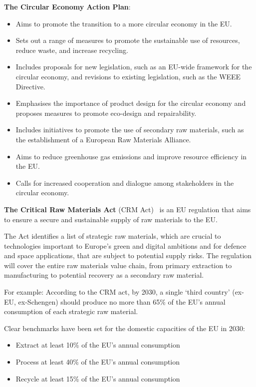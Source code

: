 \textbf{The Circular Economy Action Plan}:
\begin{itemize}
  \item Aims to promote the transition to a more circular economy in the EU.
  \item Sets out a range of measures to promote the sustainable use of resources, reduce waste, and increase recycling.
  \item Includes proposals for new legislation, such as an EU-wide framework for the circular economy, and revisions to existing legislation, such as the WEEE Directive.
  \item Emphasises the importance of product design for the circular economy and proposes measures to promote eco-design and repairability.
  \item Includes initiatives to promote the use of secondary raw materials, such as the establishment of a European Raw Materials Alliance.
  \item Aims to reduce greenhouse gas emissions and improve resource efficiency in the EU.
  \item Calls for increased cooperation and dialogue among stakeholders in the circular economy.
\end{itemize}



\textbf{The Critical Raw Materials Act} (CRM Act)~\cite{eu2023crmact} is an EU regulation that aims to ensure a secure and sustainable supply of raw materials to the EU.

The Act identifies a list of strategic raw materials, which are crucial to technologies important to Europe's green and digital ambitions and for defence and space applications, that are subject to potential supply risks. The regulation will cover the entire raw materials value chain, from primary extraction to manufacturing to potential recovery as a secondary raw material.

For example: According to the CRM act, by 2030, a single `third country' (ex-EU, ex-Schengen) should produce no more than 65\% of the EU's annual consumption of each strategic raw material.

Clear benchmarks have been set for the domestic capacities of the EU in 2030:
\begin{itemize}
  \item Extract at least 10\% of the EU's annual consumption
  \item Process at least 40\% of the EU's annual consumption
  \item Recycle at least 15\% of the EU's annual consumption
\end{itemize}

